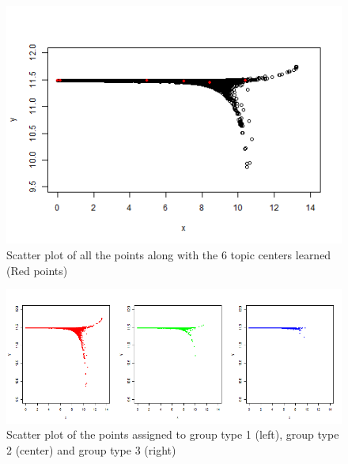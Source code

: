 \documentclass[letterpaper]{article}
\begin{document}
\begin{figure}[t]
\begin{center}
\includegraphics[bb = 0 15 460 290,clip=true,scale=0.9]{Topics.png}
\end{center}
\caption{Scatter plot of all the points along with the 6 topic centers learned (Red points)}\label{learnedTopics}
\end{figure}

\begin{figure}[t]
\begin{center}
\includegraphics[bb = 0 5 785 285,clip=true,scale=0.65]{Groups.png}
\end{center}
\caption{Scatter plot of the points assigned to group type 1 (left), group type 2 (center) and group type 3 (right)}\label{learnedGroups}
\end{figure}
\end{document}
